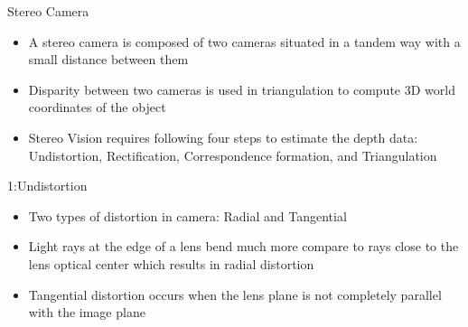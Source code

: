 \documentclass[10pt]{beamer}
\begin{document}
\begin{frame}{Stereo Camera}
   \begin{itemize}
       \item A stereo camera is composed of two cameras situated in a tandem way with a small distance between them
       \item Disparity between two cameras is used in triangulation to compute 3D world coordinates of the object
       \item Stereo Vision requires following four steps to estimate the depth data: Undistortion, Rectification, Correspondence formation, and Triangulation
   \end{itemize}
   
   \begin{block}{1:Undistortion}
     \begin{itemize}
         \item Two types of distortion in camera: Radial and Tangential
         \item Light rays at the edge of a lens bend much more compare to rays close to the lens optical center which results in radial distortion
         \item Tangential distortion occurs when the lens plane is not completely parallel with the image plane 
     \end{itemize}
   \end{block}
\end{frame}
\end{document}
